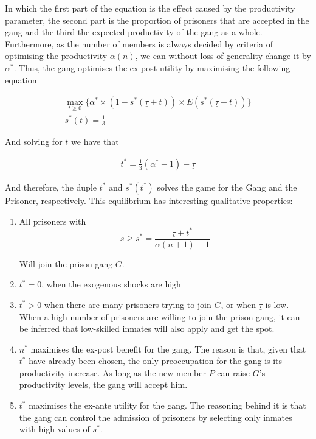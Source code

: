\documentclass[a4paper,12pt]{article}
\begin{document}
In which the first part of the equation is the effect caused by the productivity parameter, the second part is the proportion of prisoners that are accepted in the gang and the third the expected productivity of the gang as a whole. Furthermore, as the number of members is always decided by criteria of optimising the productivity $\alpha(n)$, we can without loss of generality change it by $\alpha^*$. Thus, the gang optimises the ex-post utility by maximising the following equation

\begin{equation}
\begin{split}
\max_{t \geq 0} \{ \alpha^* \times (1-s^*(\underline{\tau} +t)) \times E(s^*(\underline{\tau} + t)) \} \\
s^*(t) = \frac{1}{3}
\end{split}
\end{equation}

And solving for $t$ we have that

\begin{equation}
\begin{split}
t^* = \frac{1}{3}(\alpha^*-1) - \underline{\tau}
\end{split}
\end{equation}

And therefore, the duple $t^*$ and $s^*(t^*)$ solves the game for the Gang and the Prisoner, respectively.
This equilibrium has interesting qualitative properties:

\begin{enumerate}
\item All prisoners with $$ s \geq s^*  = \frac{\underline{\tau} + t^* }{\alpha (n + 1) - 1}$$

Will join the prison gang $G$.

\item $t^* = 0$, when the exogenous shocks are high

\item $t^* > 0$ when there are many prisoners trying to join $G$, or when $\underline{\tau}$ is low. When a high number of prisoners are willing to join the prison gang, it can be inferred that low-skilled inmates will also apply and get the spot.

\item $n^*$ maximises the ex-post benefit for the gang. The reason is that, given that $t^*$ have already been chosen, the only preoccupation for the gang is its productivity increase. As long as the new member $P$ can raise $G$'s productivity levels, the gang will accept him.

\item $t^*$ maximises the ex-ante utility for the gang. The reasoning behind it is that the gang can control the admission of prisoners by selecting only inmates with high values of $s^*$.
\end{enumerate}
\end{document}
